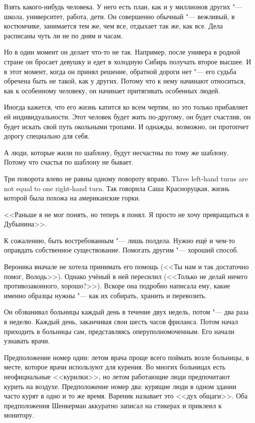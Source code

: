 \textspace

Взять какого-нибудь человека.
У него есть план, как и у миллионов других "--- школа, университет, работа, дети.
Он совершенно обычный "--- вежливый, в костюмчике, занимается тем же, чем все, отдыхает так же, как все.
Дела расписаны чуть ли не по дням и часам.

Но в один момент он делает что-то не так.
Например, после универа в родной стране он бросает девушку и едет в холодную Сибирь получать второе высшее.
И в этот момент, когда он принял решение, обратной дороги нет "--- его судьба обречена быть не такой, как у других.
Потому что к нему начинают относиться, как к особенному человеку, он начинает притягивать особенных людей.

Иногда кажется, что его жизнь катится ко всем чертям, но это только прибавляет ей индивидуальности.
Этот человек будет жить по-другому, он будет счастлив, он будет искать свой путь окольными тропами.
И однажды, возможно, он протопчет дорогу специально для себя.

А люди, которые жили по шаблону, будут несчастны по тому же шаблону.
Потому что счастья по шаблону не бывает.

{Три поворота влево не равны одному повороту вправо.}
{Three left-hand turns are not equal to one right-hand turn.}
Так говорила Саша Красноруцкая, жизнь которой была похожа на американские горки.

<<Раньше я не мог понять, но теперь я понял.
Я просто не хочу превращаться в Дубынина>>.

\textspace

\label{Tue_2012_07_24}

К сожалению, быть востребованным "--- лишь полдела.
Нужно ещё и чем-то оправдать собственное существование.
Помогать другим "--- хороший способ.

Вероника вначале не хотела принимать его помощь (<<Ты нам и так достаточно помог, Володь>>).
Однако учёный в ней пересилил (<<Только не делай ничего противозаконного, хорошо?>>).
Вскоре она подробно написала ему, какие именно образцы нужны "--- как их собирать, хранить и перевозить.

Он обзванивал больницы каждый день в течение двух недель, потом "--- два раза в неделю.
Каждый день, заканчивая свои шесть часов фриланса.
Потом начал приходить в больницы сам, представляясь оперуполномоченным.
Его начали узнавать врачи.

Предположение номер один: летом врача проще всего поймать возле больницы, в месте, которое врачи используют для курения.
Во многих больницах есть неофициальные <<курилки>>, но летом работающие люди предпочитают курить на воздухе.
Предположение номер два: курящие люди в одном здании часто курят в одно и то же время.
Вареник называет это <<дух общаги>>.
Оба предположения Шенкерман аккуратно записал на стикерах и приклеил к монитору.

